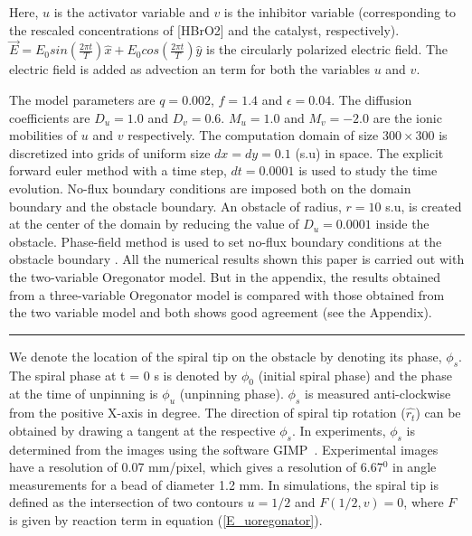 \documentclass[%
 preprint,
 amsmath,amssymb,
 aps,
]{revtex4-2}
\begin{document}
Here, $u$ is the activator variable and $v$ is the inhibitor variable (corresponding to the rescaled concentrations of [HBrO2] and the catalyst, respectively). $\vec{E} = E_{0} sin(\frac{2\pi t}{T})\hat{x} + E_{0} cos(\frac{2\pi t}{T})\hat{y}$ is the circularly polarized electric field. The electric field is added as advection an term for both the variables $u$ and $v$. 

The model parameters are $q = 0.002$, $f = 1.4$ and $\epsilon=0.04$. The diffusion coefficients are $D_{u}=1.0$ and $D_{v}=0.6$. $M_{u}=1.0$ and $M_{v}=-2.0$ are the ionic mobilities of $u$ and $v$ respectively. The computation domain of size $300 \times 300$ is discretized into grids of uniform size $dx=dy=0.1$ (s.u) in space. The explicit forward euler method with a time step, $dt=0.0001$ is used to study the time evolution. No-flux boundary conditions are imposed both on the domain boundary and the obstacle boundary. An obstacle of radius, $r = 10$ s.u, is created at the center of the domain by reducing the value of $D_{u}=0.0001$ inside the obstacle. Phase-field method is used to set no-flux boundary conditions at the obstacle boundary \cite{fenton2005modeling}. 
All the numerical results shown this paper is carried out with the two-variable Oregonator model. But in the appendix, the results obtained from a three-variable Oregonator model is compared with those obtained from the two variable model and both shows good agreement (see the Appendix).
 

\vspace{5pt}
\hrule
\vspace{5pt}


We denote the location of the spiral tip on the obstacle by denoting its phase, $\phi_s$. The spiral phase at t = 0 s is denoted by $\phi_0$ (initial spiral phase) and the phase at the time of unpinning is $\phi_u$ (unpinning phase). $\phi_s$ is measured anti-clockwise from the positive X-axis in degree.
The direction of spiral tip rotation ($\hat{r_t}$) can be obtained by drawing a tangent at the respective $\phi_{s}$. In experiments, $\phi_s$ is determined from the images using the software GIMP~\cite{gimp}.
Experimental images have a resolution of 0.07 mm/pixel, which gives a resolution of 6.67$^0$ in angle measurements for a bead of diameter 1.2 mm.
In simulations, the spiral tip is defined as the intersection of two contours
$u=1/2$ and $F(1/2,v) = 0$, where $F$ is given by reaction term in equation 
(\ref{E_uoregonator})\cite{barkley1991model}.
\end{document}
